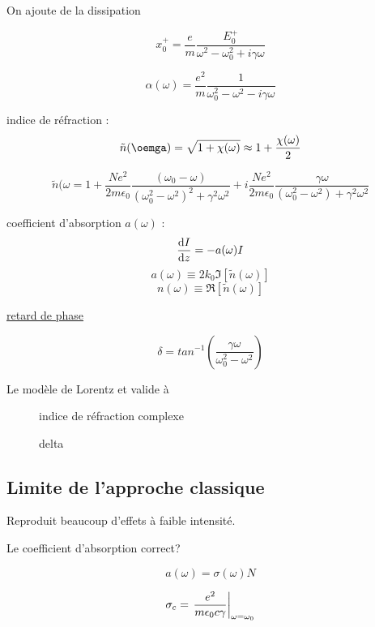 On ajoute de la dissipation

$$x_0^{+}= \frac{e}{m} \frac{E_0^{+}}{\omega^{2}-\omega_0^{2}+i\gamma\omega} $$ 

$$\alpha(\omega) = \frac{e^{2}}{m} \frac{1}{\omega_0^{2}-\omega^{2}-i\gamma\omega} $$ 


indice de réfraction : $$\tilde n (\oemga) = \sqrt{1 +\chi(\omega)} \approx 1 + \frac{\chi(\omega)}{2}$$ 

$$\tilde n (\omega = 1 + \frac{Ne^{2}}{2m\epsilon_0} \frac{(\omega_0 -\omega)}{\left( \omega_0^{2}-\omega^2 \right)^2 +\gamma^2\omega^2} +i \frac{Ne^{2}}{2m\epsilon_0} \frac{\gamma \omega}{\left( \omega_0^{2}-\omega^2 \right) + \gamma^2\omega^2} $$ 


coefficient d'absorption $a(\omega)$ : $$\dv{I}{z} = -a(\omega)I$$  
$$a(\omega) \equiv 2k_0 \Im \left[ \tilde n (\omega) \right] $$ 
$$n (\omega) \equiv \Re \left[ \tilde n (\omega) \right] $$ 

\underline{retard de phase} 

$$\delta = tan^{-1} \left( \frac{\gamma\omega}{\omega_0^{2}-\omega^2}  \right) $$ 

\begin{tcolorbox}[title=]
    Le modèle de Lorentz et valide à  
\end{tcolorbox}

\begin{figure}[ht]
    \centering
    \caption{indice de réfraction complexe}
    \label{fig:indice-de-réfraction-complexe}
\end{figure}




\begin{figure}[ht]
    \centering
    \caption{delta}
    \label{fig:delta}
\end{figure}
\clearpage



\pagebreak

\subsection{Limite de l'approche classique}

Reproduit beaucoup d'effets à faible intensité.


Le coefficient d'absorption correct?


$$a(\omega) = \sigma(\omega) N$$ 


$$\sigma_c = \eval{\frac{e^2}{m\epsilon_0 c\gamma}}_{\omega=\omega_0}  $$ 


